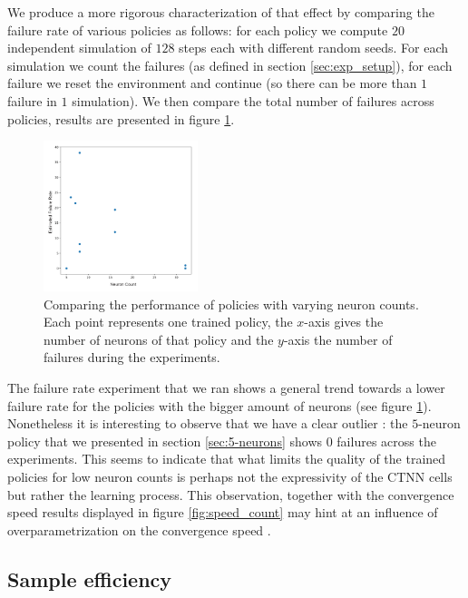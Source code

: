 We produce a more rigorous characterization of that effect by comparing the failure rate of various policies as follows: for each policy we compute $20$ independent simulation of $128$ steps each with different random seeds. For each simulation we count the failures (as defined in section \ref{sec:exp_setup}), for each failure we reset the environment and continue (so there can be more than $1$ failure in $1$ simulation). We then compare the total number of failures across policies, results are presented in figure \ref{fig:fail_rate}.

\begin{figure}[h!]
    \centering
    \includegraphics[width=0.4\textwidth]{figures/fail_rate_over_nc.png}
    \caption{Comparing the performance of policies with varying neuron counts. Each point represents one trained policy, the $x$-axis gives the number of neurons of that policy and the $y$-axis the number of failures during the experiments.}
    \label{fig:fail_rate}
\end{figure}

The failure rate experiment that we ran shows a general trend towards a lower failure rate for the policies with the bigger amount of neurons (see figure \ref{fig:fail_rate}). Nonetheless it is interesting to observe that we have a clear outlier : the $5$-neuron policy that we presented in section \ref{sec:5-neurons} shows $0$ failures across the experiments. This seems to indicate that what limits the quality of the trained policies for low neuron counts is perhaps not the expressivity of the CTNN cells but rather the learning process. This observation, together with the convergence speed results displayed in figure \ref{fig:speed_count} may hint at an influence of overparametrization on the convergence speed \cite{pmlr-v139-simsek21a}.

\subsection{Sample efficiency}


